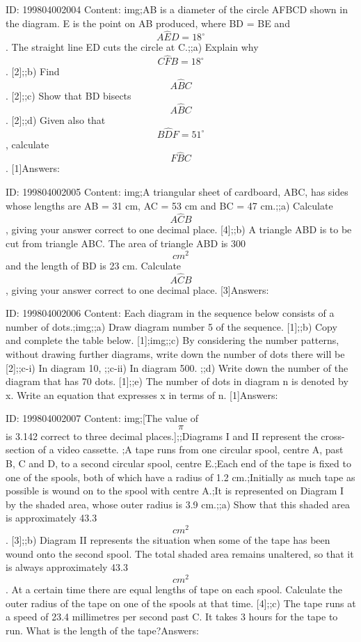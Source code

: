 \documentclass{article}
\begin{document}
ID: 199804002004
Content:
img;AB is a diameter of the circle AFBCD shown in the diagram. E is the point on AB produced, where BD = BE and $$A \hat ED = 18^{\circ}$$. The straight line ED cuts the circle at C.;;a) Explain why $$C \hat FB = 18^{\circ}$$. [2];;b) Find $$A \hat BC$$. [2];;c) Show that BD bisects $$A \hat BC$$. [2];;d) Given also that $$B \hat DF = 51^{\circ}$$, calculate $$F \hat BC$$. [1]Answers:

ID: 199804002005
Content:
img;A triangular sheet of cardboard, ABC, has sides whose lengths are AB = 31 cm, AC = 53 cm and BC = 47 cm.;;a) Calculate $$A \hat CB$$, giving your answer correct to one decimal place. [4];;b) A triangle ABD is to be cut from triangle ABC. The area of triangle ABD is 300$$cm^2$$ and the length of BD is 23 cm. Calculate $$A \hat CB$$, giving your answer correct to one decimal place. [3]Answers:

ID: 199804002006
Content:
Each diagram in the sequence below consists of a number of dots.;img;;a) Draw diagram number 5 of the sequence. [1];;b) Copy and complete the table below. [1];img;;c) By considering the number patterns, without drawing further diagrams, write down the number of dots there will be [2];;c-i) In diagram 10, ;;c-ii) In diagram 500. ;;d) Write down the number of the diagram that has 70 dots. [1];;e) The number of dots in diagram n is denoted by x. Write an equation that expresses x in terms of n. [1]Answers:

ID: 199804002007
Content:
img;[The value of $$\pi$$ is 3.142 correct to three decimal places.];;Diagrams I and II represent the cross-section of a video cassette. ;A tape runs from one circular spool, centre A, past B, C and D, to a second circular spool, centre E.;Each end of the tape is fixed to one of the spools, both of which have a radius of 1.2 cm.;Initially as much tape as possible is wound on to the spool with centre A.;It is represented on Diagram I by the shaded area, whose outer radius is 3.9 cm.;;a) Show that this shaded area is approximately 43.3 $$cm^2$$. [3];;b) Diagram II represents the situation when some of the tape has been wound onto the second spool. The total shaded area remains unaltered, so that it is always approximately 43.3 $$cm^2$$. At a certain time there are equal lengths of tape on each spool. Calculate the outer radius of the tape on one of the spools at that time. [4];;c) The tape runs at a speed of 23.4 millimetres per second past C. It takes 3 hours for the tape to run. What is the length of the tape?Answers:
\end{document}
